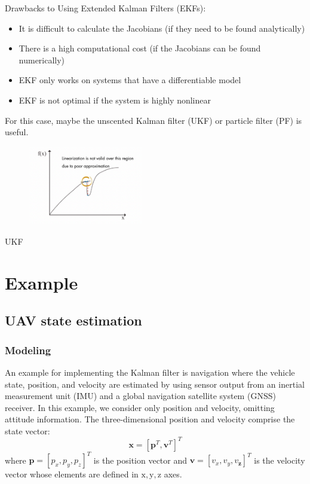 \documentclass{beamer}
\begin{document}
\begin{frame}
	Drawbacks to Using Extended Kalman Filters (EKFs):
	\begin{itemize}
		\item  	It is difficult to calculate the Jacobians (if they need to be found analytically)
		\item There is a high computational cost (if the Jacobians can be found numerically)
		\item EKF only works on systems that have a differentiable model
		\item EKF is not optimal if the system is highly nonlinear
	\end{itemize}
For this case,  maybe  the unscented Kalman filter (UKF) or particle filter (PF) is useful.
	\begin{figure}
		\centering
		\includegraphics[width=5cm]{ukf2.png}
	\end{figure}
	UKF 
\end{frame}

\section{Example}
\subsection{UAV state estimation}

\begin{frame}
	\frametitle{Modeling}
	An example for implementing the Kalman filter is navigation where the vehicle state, position, and velocity are estimated by using sensor output from an inertial measurement unit (IMU) and a global navigation satellite system (GNSS) receiver. In this example, we consider only position and velocity, omitting attitude information. The three-dimensional position and velocity comprise the state vector:
	$$
	\boldsymbol{x}=\left[\boldsymbol{p}^T, \boldsymbol{v}^T\right]^T
	$$
	where $\boldsymbol{p}=\left[p_x, p_y, p_z\right]^T$ is the position vector and $\boldsymbol{v}=\left[v_x, v_y, v_{\mathbf{z}}\right]^T$ is the velocity vector whose elements are defined in $\mathrm{x}, \mathrm{y}, \mathrm{z}$ axes.
\end{frame}
\end{document}
